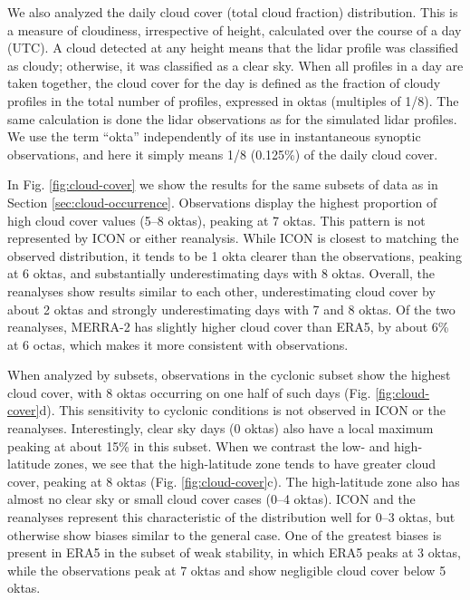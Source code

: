 \documentclass[draft]{agujournal2019}
\begin{document}
We also analyzed the daily cloud cover (total cloud fraction) distribution. This is a measure of cloudiness, irrespective of height, calculated over the course of a day (UTC). A cloud detected at any height means that the lidar profile was classified as cloudy; otherwise, it was classified as a clear sky. When all profiles in a day are taken together, the cloud cover for the day is defined as the fraction of cloudy profiles in the total number of profiles, expressed in oktas (multiples of 1/8). The same calculation is done the lidar observations as for the simulated lidar profiles. We use the term ``okta'' independently of its use in instantaneous synoptic observations, and here it simply means 1/8 (0.125\%) of the daily cloud cover.

In Fig. \ref{fig:cloud-cover} we show the results for the same subsets of data as in Section \ref{sec:cloud-occurrence}. Observations display the highest proportion of high cloud cover values (5--8 oktas), peaking at 7 oktas. This pattern is not represented by ICON or either reanalysis. While ICON is closest to matching the observed distribution, it tends to be 1 okta clearer than the observations, peaking at 6 oktas, and substantially underestimating days with 8 oktas. Overall, the reanalyses show results similar to each other, underestimating cloud cover by about 2 oktas and strongly underestimating days with 7 and 8 oktas. Of the two reanalyses, MERRA-2 has slightly higher cloud cover than ERA5, by about 6\% at 6 octas, which makes it more consistent with observations.

When analyzed by subsets, observations in the cyclonic subset show the highest cloud cover, with 8 oktas occurring on one half of such days (Fig. \ref{fig:cloud-cover}d). This sensitivity to cyclonic conditions is not observed in ICON or the reanalyses. Interestingly, clear sky days (0 oktas) also have a local maximum peaking at about 15\% in this subset. When we contrast the low- and high-latitude zones, we see that the high-latitude zone tends to have greater cloud cover, peaking at 8 oktas (Fig. \ref{fig:cloud-cover}c). The high-latitude zone also has almost no clear sky or small cloud cover cases (0--4 oktas). ICON and the reanalyses represent this characteristic of the distribution well for 0--3 oktas, but otherwise show biases similar to the general case. One of the greatest biases is present in ERA5 in the subset of weak stability, in which ERA5 peaks at 3 oktas, while the observations peak at 7 oktas and show negligible cloud cover below 5 oktas.
\end{document}
